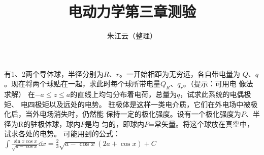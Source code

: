 \documentclass{exam}
\author{朱江云（整理）}
\title{电动力学第三章测验}
\date{}
\begin{document}
\maketitle
\begin{questions}
    \question 有1、2两个导体球，半径分别为$R$、$r$。一开始相距为无穷远，各自带电量为
    $Q$、$q$。现在将两个球贴在一起，求此时每个球所带电量$Q_R$、$q_r$。（提示：可用电
    像法求解）
    \question 在$-a \leq  z \leq  a$的直线上均匀分布着电荷，总量为$q$，试求此系统的电偶极矩、
    电四极矩以及远处的电势。
    \question 驻极体是这样一类电介质，它们在外电场中被极化后，当外电场消失时，仍然能
    保持一定的极化强度。设有一个极化强度为$P$、半径为R的驻极体球，球内$P$是均
    匀的，即球内$P$=常矢量。将这个球放在真空中，试求各处的电势。
    可能用到的公式：
    $\int \frac{\sin x \cos x}{\sqrt{a-\cos x}}\dd x = \frac{2}{3}\sqrt{a- \cos x}(2a+\cos x)+C$
\end{questions}
\end{document}
